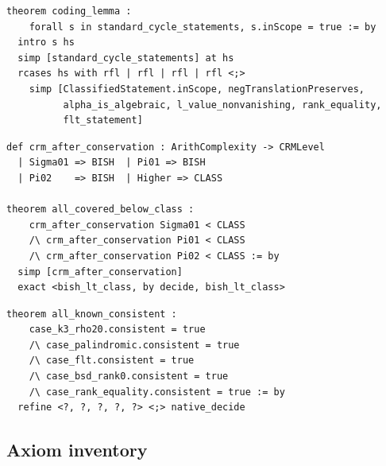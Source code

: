 \documentclass[11pt,a4paper]{article}
\theoremstyle{plain}
\theoremstyle{definition}
\begin{document}
\begin{tcolorbox}[leanbox={Lean: Coding Lemma (Theorem C)}]
\begin{Verbatim}[fontsize=\small]
theorem coding_lemma :
    forall s in standard_cycle_statements, s.inScope = true := by
  intro s hs
  simp [standard_cycle_statements] at hs
  rcases hs with rfl | rfl | rfl | rfl <;>
    simp [ClassifiedStatement.inScope, negTranslationPreserves,
          alpha_is_algebraic, l_value_nonvanishing, rank_equality,
          flt_statement]
\end{Verbatim}
\end{tcolorbox}

\begin{tcolorbox}[leanbox={Lean: Conservation descent (Theorem A)}]
\begin{Verbatim}[fontsize=\small]
def crm_after_conservation : ArithComplexity -> CRMLevel
  | Sigma01 => BISH  | Pi01 => BISH
  | Pi02    => BISH  | Higher => CLASS

theorem all_covered_below_class :
    crm_after_conservation Sigma01 < CLASS
    /\ crm_after_conservation Pi01 < CLASS
    /\ crm_after_conservation Pi02 < CLASS := by
  simp [crm_after_conservation]
  exact <bish_lt_class, by decide, bish_lt_class>
\end{Verbatim}
\end{tcolorbox}

\begin{tcolorbox}[leanbox={Lean: Case study consistency}]
\begin{Verbatim}[fontsize=\small]
theorem all_known_consistent :
    case_k3_rho20.consistent = true
    /\ case_palindromic.consistent = true
    /\ case_flt.consistent = true
    /\ case_bsd_rank0.consistent = true
    /\ case_rank_equality.consistent = true := by
  refine <?, ?, ?, ?, ?> <;> native_decide
\end{Verbatim}
\end{tcolorbox}

\subsection{Axiom inventory}
\end{document}
